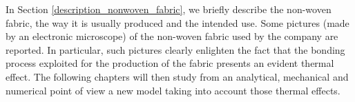 \par
In Section \ref{description_nonwoven_fabric}, we briefly describe the non-woven fabric, the way it is usually produced and the intended use. Some pictures (made by an electronic microscope) of the non-woven fabric used by the company are reported. In particular, such pictures clearly enlighten the fact that the bonding process exploited for the production of the fabric presents an evident thermal effect. The following chapters will then study from an analytical, mechanical and numerical point of view a new model taking into account those thermal effects.
